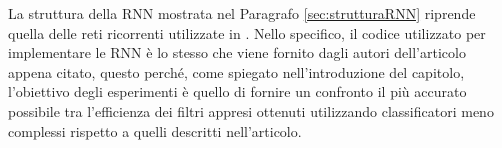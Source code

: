 \documentclass[../../main.tex]{subfiles}
\begin{document}
    La struttura della RNN mostrata nel Paragrafo \ref{sec:strutturaRNN} riprende quella delle reti ricorrenti utilizzate in \cite{ma2020}. Nello specifico, il codice utilizzato per implementare le RNN è lo stesso che viene fornito dagli autori dell'articolo appena citato, questo perché, come spiegato nell'introduzione del capitolo, l'obiettivo degli esperimenti è quello di fornire un confronto il più accurato possibile tra l'efficienza dei  filtri appresi ottenuti utilizzando classificatori meno complessi rispetto a quelli descritti nell'articolo. 
\end{document}
